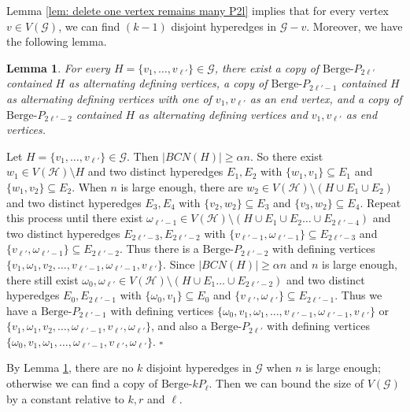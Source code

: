 \documentclass[12pt]{article}%
\newtheorem{lemma}[theorem]{Lemma}
\newenvironment{proof}{{\noindent\it Proof.}}{\hfill $\square$\par}
\newcommand{\ber}{\text{Berge-}}
\newcommand{\mh}{\mathcal{H}}
\newcommand{\mg}{\mathcal{G}}
\begin{document}
 Lemma \ref{lem: delete one vertex remains many P2l} implies that for every vertex $v\in V(\mg)$, we can find $(k-1)$ disjoint hyperedges in $\mg-v$.
Moreover, we have the following lemma.
\begin{lemma}\label{pro: find berge P2l from mg}
    For every $H=\{v_1,\dots,v_{\ell'}\}\in \mg$, there exist a copy of $\ber P_{2\ell'}$ contained $H$ as alternating defining vertices, a copy of $\ber P_{2\ell'-1}$ contained $H$ as alternating defining vertices with one of $v_{1},v_{\ell'}$ as an end vertex, and a copy of $\ber P_{2\ell'-2}$ contained $H$ as alternating defining vertices and  $v_1,v_{\ell'}$ as end vertices.
\end{lemma}
\begin{proof} Let $H=\{v_1,\dots,v_{\ell'}\}\in \mg$. Then $|BCN(H)|\ge \alpha n$. So there exist $w_1\in V(\mh)\setminus H $ and two distinct hyperedges $E_1,E_2$ with $\{w_1,v_1\}\subseteq E_1$ and $\{w_1,v_2\}\subseteq E_2$. When $n$ is large enough, there are $w_2\in V(\mh)\setminus(H\cup E_1\cup E_2)$ and two distinct hyperedges $E_3,E_4$ with $\{v_2,w_2\}\subseteq E_3$ and $\{v_3,w_2\}\subseteq E_4$. Repeat this process until there exist $\omega_{\ell'-1}\in V(\mathcal{H})\setminus (H\cup E_1 \cup E_2\ldots\cup E_{2\ell'-4})$ and two distinct hyperedges $E_{2\ell'-3},E_{2\ell'-2}$ with $\{v_{\ell'-1},\omega_{\ell'-1}\}\subseteq E_{2\ell'-3}$ and $\{v_{\ell'},\omega_{\ell'-1}\}\subseteq E_{2\ell'-2}$. Thus there is a $\ber P_{2\ell'-2}$ with defining vertices $\{v_1,\omega_1,v_2,\ldots,v_{\ell'-1},\omega_{\ell'-1},v_{\ell'}\}$. Since $|BCN(H)|\ge \alpha n$ and $n$ is large enough, there still exist $\omega_0,\omega_{\ell'}\in V(\mathcal{H})\setminus (H\cup E_1\ldots\cup E_{2\ell'-2})$ and two distinct hyperedges ${E_{0}},E_{2\ell'-1}$ with $\{\omega_{0},v_1\}\subseteq E_{0}$ and $\{v_{\ell'},\omega_{\ell'}\}\subseteq E_{2\ell'-1}$. Thus we have a $\ber P_{2\ell'-1}$ with defining vertices $\{\omega_{0},v_1,\omega_1,\ldots,v_{\ell'-1},\omega_{\ell'-1},v_{\ell'}\}$ or $\{v_1,\omega_1,v_2,\ldots,\omega_{\ell'-1},v_{\ell'},\omega_{\ell'}\}$, and also a $\ber P_{2\ell'}$ with defining vertices $\{\omega_{0},v_1,\omega_1,\ldots,\omega_{\ell'-1},v_{\ell'},\omega_{\ell'}\}$.
\end{proof}

By Lemma \ref{pro: find berge P2l from mg},  there are no $k$ disjoint hyperedges in $\mg$ when $n$ is large enough; otherwise we can find a copy of $\ber kP_{\ell}$. Then we can bound the size of $V(\mg)$ by a constant relative to $k,r$ and $\ell$.
\end{document}
